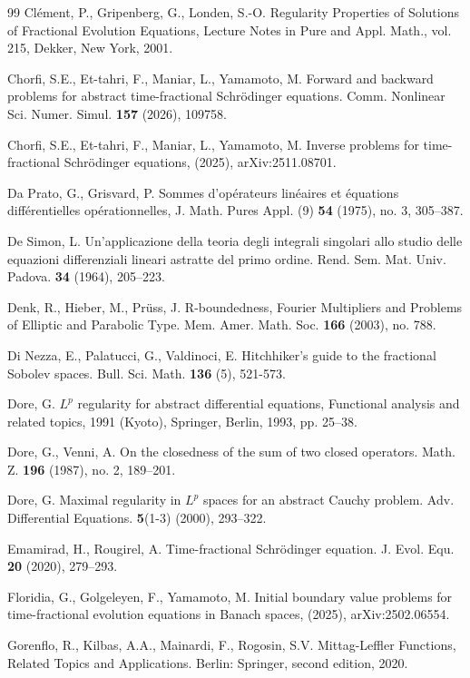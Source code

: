 \documentclass[reqno]{amsart}
\numberwithin{equation}{section}
\begin{document}
\begin{thebibliography}{99}
Clément, P., Gripenberg, G., Londen, S.-O. Regularity Properties of Solutions of Fractional Evolution Equations, Lecture Notes in Pure and Appl. Math., vol. 215, Dekker, New York, 2001.

Chorfi, S.E., Et-tahri, F., Maniar, L., Yamamoto, M. Forward and backward problems for abstract time-fractional Schr\"odinger equations. Comm. Nonlinear Sci. Numer. Simul. \textbf{157} (2026), 109758.

Chorfi, S.E., Et-tahri, F., Maniar, L., Yamamoto, M. Inverse problems for time-fractional Schr\"odinger equations, (2025), arXiv:2511.08701.

Da Prato, G., Grisvard, P. Sommes d'opérateurs linéaires et équations différentielles opérationnelles, J. Math. Pures Appl. (9) \textbf{54} (1975), no. 3, 305–387.

De Simon, L. Un'applicazione della teoria degli integrali singolari allo studio delle equazioni differenziali lineari astratte del primo ordine. Rend. Sem. Mat. Univ. Padova. \textbf{34} (1964), 205–223.

Denk, R., Hieber, M., Prüss, J. R-boundedness, Fourier Multipliers and Problems of Elliptic and Parabolic Type. Mem. Amer. Math. Soc. \textbf{166} (2003), no. 788.

Di Nezza, E., Palatucci, G., Valdinoci, E. Hitchhiker's guide to the fractional Sobolev spaces. Bull. Sci. Math. \textbf{136} (5), 521-573.

 Dore, G. $L^p$ regularity for abstract differential equations, Functional analysis
and related topics, 1991 (Kyoto), Springer, Berlin, 1993, pp. 25–38.

 Dore, G., Venni, A. On the closedness of the sum of two closed operators. Math. Z. \textbf{196} (1987), no. 2, 189–201.

Dore, G. Maximal regularity in $L^p$ spaces for an abstract Cauchy problem. Adv. Differential Equations. \textbf{5}(1-3) (2000), 293–322.

Emamirad, H., Rougirel, A. Time-fractional Schrödinger equation. J. Evol. Equ. \textbf{20} (2020), 279–293.

Floridia, G., Golgeleyen, F., Yamamoto, M. Initial boundary value problems for time-fractional evolution equations in Banach spaces, (2025), arXiv:2502.06554.

Gorenflo, R., Kilbas, A.A., Mainardi, F., Rogosin, S.V. Mittag-Leffler Functions, Related Topics and Applications. Berlin: Springer, second edition, 2020.


\end{thebibliography}
\end{document}
